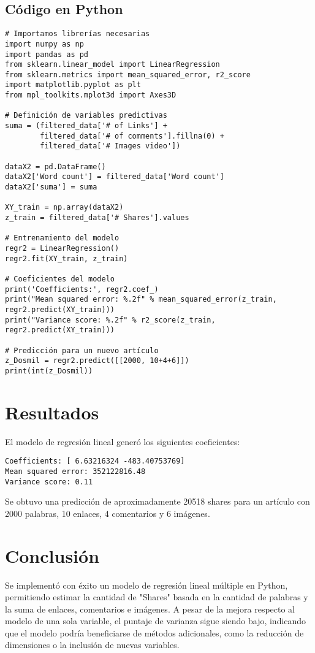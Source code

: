 \documentclass{article}
\begin{document}
\subsection{C\'odigo en Python}
\begin{verbatim}
# Importamos librerías necesarias
import numpy as np
import pandas as pd
from sklearn.linear_model import LinearRegression
from sklearn.metrics import mean_squared_error, r2_score
import matplotlib.pyplot as plt
from mpl_toolkits.mplot3d import Axes3D

# Definición de variables predictivas
suma = (filtered_data['# of Links'] + 
        filtered_data['# of comments'].fillna(0) + 
        filtered_data['# Images video'])

dataX2 = pd.DataFrame()
dataX2['Word count'] = filtered_data['Word count']
dataX2['suma'] = suma

XY_train = np.array(dataX2)
z_train = filtered_data['# Shares'].values

# Entrenamiento del modelo
regr2 = LinearRegression()
regr2.fit(XY_train, z_train)

# Coeficientes del modelo
print('Coefficients:', regr2.coef_)
print("Mean squared error: %.2f" % mean_squared_error(z_train, regr2.predict(XY_train)))
print("Variance score: %.2f" % r2_score(z_train, regr2.predict(XY_train)))

# Predicción para un nuevo artículo
z_Dosmil = regr2.predict([[2000, 10+4+6]])
print(int(z_Dosmil))
\end{verbatim}

\section{Resultados}
El modelo de regresi\'on lineal gener\'o los siguientes coeficientes:
\begin{verbatim}
Coefficients: [ 6.63216324 -483.40753769]
Mean squared error: 352122816.48
Variance score: 0.11
\end{verbatim}

Se obtuvo una predicci\'on de aproximadamente 20518 shares para un art\'iculo con 2000 palabras, 10 enlaces, 4 comentarios y 6 im\'agenes.

\section{Conclusi\'on}
Se implement\'o con \'exito un modelo de regresi\'on lineal m\'ultiple en Python, permitiendo estimar la cantidad de "Shares" basada en la cantidad de palabras y la suma de enlaces, comentarios e im\'agenes. A pesar de la mejora respecto al modelo de una sola variable, el puntaje de varianza sigue siendo bajo, indicando que el modelo podr\'ia beneficiarse de m\'etodos adicionales, como la reducci\'on de dimensiones o la inclusi\'on de nuevas variables.
\end{document}

